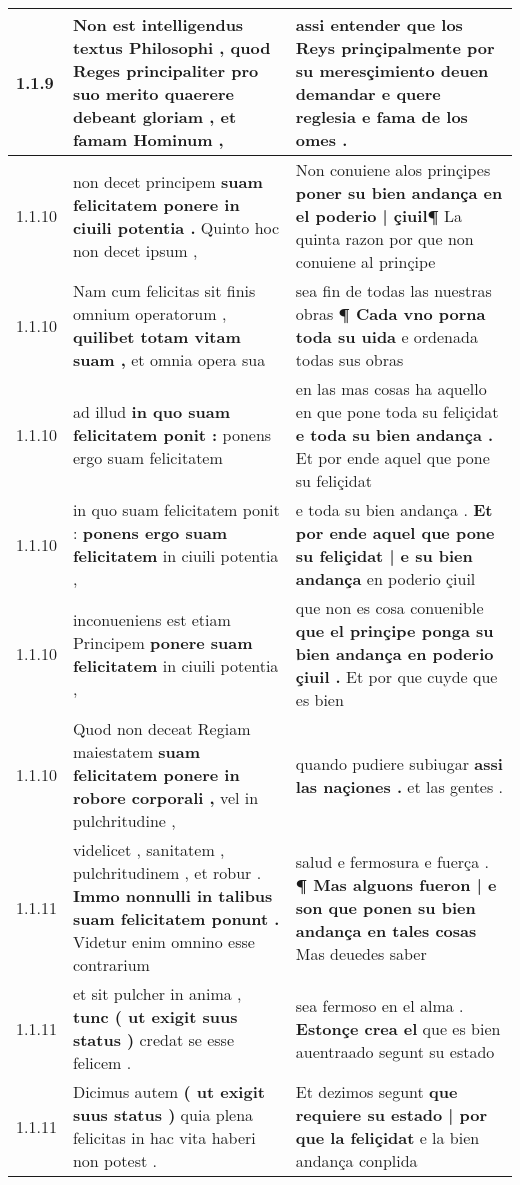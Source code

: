 \begin{tabular}{|p{1cm}|p{6.5cm}|p{6.5cm}|}
1.1.9 & Non est intelligendus textus Philosophi , \textbf{ quod Reges principaliter pro suo merito quaerere debeant gloriam , } et famam Hominum , & assi entender \textbf{ que los Reys prinçipalmente por su meresçimiento deuen demandar } e quere reglesia e fama de los omes . \\\hline
1.1.10 & non decet principem \textbf{ suam felicitatem ponere in ciuili potentia . } Quinto hoc non decet ipsum , & Non conuiene alos prinçipes \textbf{ poner su bien andança en el poderio | çiuil¶ } La quinta razon por que non conuiene al prinçipe \\\hline
1.1.10 & Nam cum felicitas sit finis omnium operatorum , \textbf{ quilibet totam vitam suam , } et omnia opera sua & sea fin de todas las nuestras obras \textbf{ ¶ Cada vno porna toda su uida } e ordenada todas sus obras \\\hline
1.1.10 & ad illud \textbf{ in quo suam felicitatem ponit : } ponens ergo suam felicitatem & en las mas cosas ha aquello en que pone toda su feliçidat \textbf{ e toda su bien andança . } Et por ende aquel que pone su feliçidat \\\hline
1.1.10 & in quo suam felicitatem ponit : \textbf{ ponens ergo suam felicitatem } in ciuili potentia , & e toda su bien andança . \textbf{ Et por ende aquel que pone su feliçidat | e su bien andança } en poderio çiuil \\\hline
1.1.10 & inconueniens est etiam Principem \textbf{ ponere suam felicitatem } in ciuili potentia , & que non es cosa conuenible \textbf{ que el prinçipe ponga su bien andança en poderio çiuil . } Et por que cuyde que es bien \\\hline
1.1.10 & Quod non deceat Regiam maiestatem \textbf{ suam felicitatem ponere in robore corporali , } vel in pulchritudine , & quando pudiere subiugar \textbf{ assi las naçiones . } et las gentes . \\\hline
1.1.11 & videlicet , sanitatem , pulchritudinem , et robur . \textbf{ Immo nonnulli in talibus suam felicitatem ponunt . } Videtur enim omnino esse contrarium & salud e fermosura e fuerça . \textbf{ ¶ Mas alguons fueron | e son que ponen su bien andança en tales cosas } Mas deuedes saber \\\hline
1.1.11 & et sit pulcher in anima , \textbf{ tunc ( ut exigit suus status ) } credat se esse felicem . & sea fermoso en el alma . \textbf{ Estonçe crea el } que es bien auentraado segunt su estado \\\hline
1.1.11 & Dicimus autem \textbf{ ( ut exigit suus status ) } quia plena felicitas in hac vita haberi non potest . & Et dezimos segunt \textbf{ que requiere su estado | por que la feliçidat } e la bien andança conplida \\\hline

\end{tabular}
